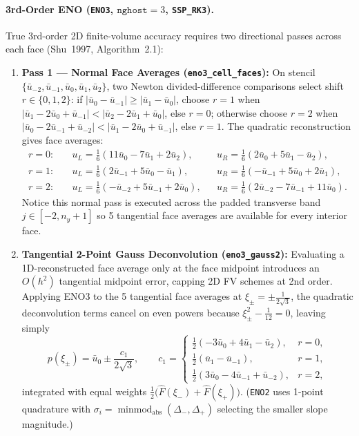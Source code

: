 \documentclass[11pt,a4paper]{article}
\theoremstyle{definition}
\newcommand{\code}[1]{\texttt{#1}}
\begin{document}
\paragraph{3rd-Order ENO (\code{ENO3}, $\code{nghost}=3$, \code{SSP\_RK3}).}
True 3rd-order 2D finite-volume accuracy requires two directional passes across each face (Shu~1997, Algorithm~2.1):
\begin{enumerate}
\item \textbf{Pass 1 --- Normal Face Averages (\code{eno3\_cell\_faces}):} On stencil $\{\bar{u}_{-2}, \bar{u}_{-1}, \bar{u}_0, \bar{u}_1, \bar{u}_2\}$, two Newton divided-difference comparisons select shift $r\in\{0,1,2\}$: if $|\bar{u}_0-\bar{u}_{-1}| \ge |\bar{u}_1-\bar{u}_0|$, choose $r=1$ when $|\bar{u}_1 - 2\bar{u}_0 + \bar{u}_{-1}| < |\bar{u}_2 - 2\bar{u}_1 + \bar{u}_0|$, else $r=0$; otherwise choose $r=2$ when $|\bar{u}_0 - 2\bar{u}_{-1} + \bar{u}_{-2}| < |\bar{u}_1 - 2\bar{u}_0 + \bar{u}_{-1}|$, else $r=1$. The quadratic reconstruction gives face averages:
\begin{align*}
r=0:\quad & u_L = \tfrac{1}{6}(11\bar{u}_0 - 7\bar{u}_1 + 2\bar{u}_2), && u_R = \tfrac{1}{6}(2\bar{u}_0 + 5\bar{u}_1 - \bar{u}_2),\\
r=1:\quad & u_L = \tfrac{1}{6}(2\bar{u}_{-1} + 5\bar{u}_0 - \bar{u}_1), && u_R = \tfrac{1}{6}(-\bar{u}_{-1} + 5\bar{u}_0 + 2\bar{u}_1),\\
r=2:\quad & u_L = \tfrac{1}{6}(-\bar{u}_{-2} + 5\bar{u}_{-1} + 2\bar{u}_0), && u_R = \tfrac{1}{6}(2\bar{u}_{-2} - 7\bar{u}_{-1} + 11\bar{u}_0).
\end{align*}
Notice this normal pass is executed across the padded transverse band $j \in [-2, n_y + 1]$ so 5 tangential face averages are available for every interior face.
\item \textbf{Tangential 2-Point Gauss Deconvolution (\code{eno3\_gauss2}):} Evaluating a 1D-reconstructed face average only at the face midpoint introduces an $O(h^2)$ tangential midpoint error, capping 2D FV schemes at 2nd order. Applying ENO3 to the 5 tangential face averages at $\xi_\pm = \pm \frac{1}{2\sqrt{3}}$, the quadratic deconvolution terms cancel on even powers because $\xi_\pm^2 - \frac{1}{12} = 0$, leaving simply
\[
p(\xi_\pm) = \bar{u}_0 \pm \frac{c_1}{2\sqrt{3}}, \qquad
c_1 = \begin{cases}
\tfrac{1}{2}(-3\bar{u}_0 + 4\bar{u}_1 - \bar{u}_2), & r=0,\\
\tfrac{1}{2}(\bar{u}_1 - \bar{u}_{-1}), & r=1,\\
\tfrac{1}{2}(3\bar{u}_0 - 4\bar{u}_{-1} + \bar{u}_{-2}), & r=2,
\end{cases}
\]
integrated with equal weights $\frac{1}{2}\bigl(\hat{F}(\xi_-) + \hat{F}(\xi_+)\bigr)$. (\code{ENO2} uses 1-point quadrature with $\sigma_i = \operatorname{minmod}_{\mathrm{abs}}(\Delta_-,\Delta_+)$ selecting the smaller slope magnitude.)
\end{enumerate}
\end{document}
